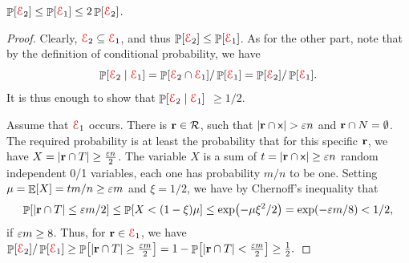 
\begin{claim}
    $\Prob{\Event_2} \leq \Prob{\Event_1} \leq 2\Prob{\Event_2}$.
\end{claim}

\begin{proof}
    Clearly, ${\textcolor{red}{\EuScript{E}}}_2 \subseteq {\textcolor{red}{\EuScript{E}}}_1$, and thus $\Prob{\Event_2}
    \leq \Prob{\Event_1}$. As for the other part, note that by the
    definition of conditional probability, we have
    \[
        \Prob{ \Event_2 \mid{ \Event_1}} = \Prob{\Event_2 \cap
           \Event_1} / \Prob{\Event_1} = \Prob{\Event_2} /
        \Prob{\Event_1}.
    \]
    It is thus enough to show that $\Prob{\Event_2 \mid{\Event_1}}$
    $\geq 1/2$.
    
    Assume that ${\textcolor{red}{\EuScript{E}}}_1$ occurs. There is $\mathbf{r} \in {\mathcal{R}}$,
    such that $\left| {\mathbf{r} \cap \mathsf{x}} \right| > {\varepsilon} n$ and
    $\mathbf{r} \cap N = \emptyset$.  The required probability is at least
    the probability that for this specific $\mathbf{r}$, we have
    $X = \left| { \mathbf{r} \cap T} \right| \geq \tfrac{{\varepsilon} n}{2}$. The variable
    $X$ is a sum of $t = \left| {\mathbf{r} \cap \mathsf{x}} \right| \geq {\varepsilon} n$
    random independent 0/1 variables, each one has probability $m/n$
    to be one. Setting $\mu = \mathop{\mathbb{E}}\!\left[ {X} \right] = t m/n \geq {\varepsilon} m$ and
    $\xi = 1/2$, we have by Chernoff's inequality that
    \begin{align*}
      \Prob{ \cardin{\range \cap T} \leq \eps m /2} %
      \leq%
      \Prob{ X  < (1-\xi) \mu }%
      \leq%
      \exp \pth{ - \mu \xi^2 / 2 }%
      =%
      \exp \pth{ - \eps m / 8 }%
      < %
      1/2,
    \end{align*}
    if ${\varepsilon} m \geq 8$.  Thus, for $\mathbf{r} \in {\textcolor{red}{\EuScript{E}}}_1$, we have
    \begin{math}
        \Prob{\Event_2} / \Prob{\Event_1} \geq \Prob{\cardin{ \range
              \cap T} \geq \tfrac{\eps m}{2}} = 1 -\Prob{
           \cardin{\range \cap T} < \frac{\eps m}{2} } \geq
        \frac{1}{2}.
    \end{math}
\end{proof}


